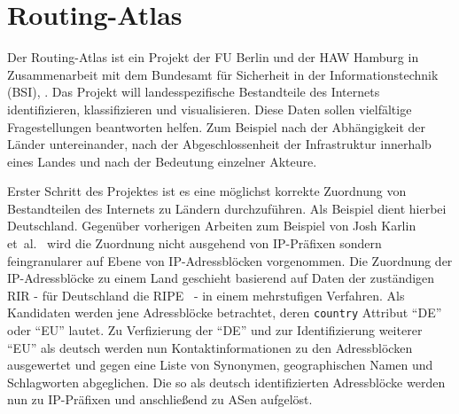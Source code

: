 \section{Routing-Atlas}\label{sec:routingatlas}

Der Routing-Atlas ist ein Projekt der FU Berlin und der HAW Hamburg in Zusammenarbeit mit dem Bundesamt für Sicherheit in der Informationstechnik (BSI), \vgl \cite{wsbh-envgi-12}.
Das Projekt will landesspezifische Bestandteile des Internets identifizieren, klassifizieren und visualisieren.
Diese Daten sollen vielfältige Fragestellungen beantworten helfen.
Zum Beispiel nach der Abhängigkeit der Länder untereinander, nach der Abgeschlossenheit der Infrastruktur innerhalb eines Landes und nach der Bedeutung einzelner Akteure.

Erster Schritt des Projektes ist es eine möglichst korrekte Zuordnung von Bestandteilen des Internets zu Ländern durchzuführen.
Als Beispiel dient hierbei Deutschland.
Gegenüber vorherigen Arbeiten zum Beispiel von Josh Karlin et~al.~\cite{0903.3218v1} wird die Zuordnung nicht ausgehend von IP-Präfixen sondern feingranularer auf Ebene von IP-Adressblöcken vorgenommen.
Die Zuordnung der IP-Adressblöcke zu einem Land geschieht basierend auf Daten der zuständigen RIR - für Deutschland die RIPE~\cite{RIPE} - in einem mehrstufigen Verfahren.
Als Kandidaten werden jene Adressblöcke betrachtet, deren \texttt{country} Attribut "`DE"' oder "`EU"' lautet.
Zu Verfizierung der "`DE"' und zur Identifizierung weiterer "`EU"' als deutsch werden nun Kontaktinformationen zu den Adressblöcken ausgewertet und gegen eine Liste von Synonymen, geographischen Namen und Schlagworten abgeglichen.
Die so als deutsch identifizierten Adressblöcke werden nun zu IP-Präfixen und anschließend zu ASen aufgelöst.

